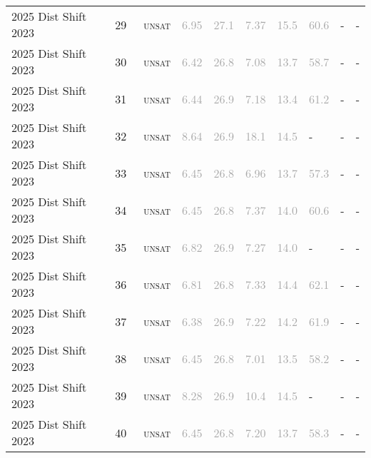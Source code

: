 \begin{center}
{\begin{longtable}{@{}llllllllll@{}}
2025 Dist Shift 2023 & 29 & ~\textsc{unsat} & \textcolor{darkgray}{6.95} & \textcolor{darkgray}{27.1} & \textcolor{darkgray}{7.37} & \textcolor{darkgray}{15.5} & \textcolor{darkgray}{60.6} & - & - \\
2025 Dist Shift 2023 & 30 & ~\textsc{unsat} & \textcolor{darkgray}{6.42} & \textcolor{darkgray}{26.8} & \textcolor{darkgray}{7.08} & \textcolor{darkgray}{13.7} & \textcolor{darkgray}{58.7} & - & - \\
2025 Dist Shift 2023 & 31 & ~\textsc{unsat} & \textcolor{darkgray}{6.44} & \textcolor{darkgray}{26.9} & \textcolor{darkgray}{7.18} & \textcolor{darkgray}{13.4} & \textcolor{darkgray}{61.2} & - & - \\
2025 Dist Shift 2023 & 32 & ~\textsc{unsat} & \textcolor{darkgray}{8.64} & \textcolor{darkgray}{26.9} & \textcolor{darkgray}{18.1} & \textcolor{darkgray}{14.5} & - & - & - \\
2025 Dist Shift 2023 & 33 & ~\textsc{unsat} & \textcolor{darkgray}{6.45} & \textcolor{darkgray}{26.8} & \textcolor{darkgray}{6.96} & \textcolor{darkgray}{13.7} & \textcolor{darkgray}{57.3} & - & - \\
2025 Dist Shift 2023 & 34 & ~\textsc{unsat} & \textcolor{darkgray}{6.45} & \textcolor{darkgray}{26.8} & \textcolor{darkgray}{7.37} & \textcolor{darkgray}{14.0} & \textcolor{darkgray}{60.6} & - & - \\
2025 Dist Shift 2023 & 35 & ~\textsc{unsat} & \textcolor{darkgray}{6.82} & \textcolor{darkgray}{26.9} & \textcolor{darkgray}{7.27} & \textcolor{darkgray}{14.0} & - & - & - \\
2025 Dist Shift 2023 & 36 & ~\textsc{unsat} & \textcolor{darkgray}{6.81} & \textcolor{darkgray}{26.8} & \textcolor{darkgray}{7.33} & \textcolor{darkgray}{14.4} & \textcolor{darkgray}{62.1} & - & - \\
2025 Dist Shift 2023 & 37 & ~\textsc{unsat} & \textcolor{darkgray}{6.38} & \textcolor{darkgray}{26.9} & \textcolor{darkgray}{7.22} & \textcolor{darkgray}{14.2} & \textcolor{darkgray}{61.9} & - & - \\
2025 Dist Shift 2023 & 38 & ~\textsc{unsat} & \textcolor{darkgray}{6.45} & \textcolor{darkgray}{26.8} & \textcolor{darkgray}{7.01} & \textcolor{darkgray}{13.5} & \textcolor{darkgray}{58.2} & - & - \\
2025 Dist Shift 2023 & 39 & ~\textsc{unsat} & \textcolor{darkgray}{8.28} & \textcolor{darkgray}{26.9} & \textcolor{darkgray}{10.4} & \textcolor{darkgray}{14.5} & - & - & - \\
2025 Dist Shift 2023 & 40 & ~\textsc{unsat} & \textcolor{darkgray}{6.45} & \textcolor{darkgray}{26.8} & \textcolor{darkgray}{7.20} & \textcolor{darkgray}{13.7} & \textcolor{darkgray}{58.3} & - & - \\

\end{longtable}}
\end{center}
